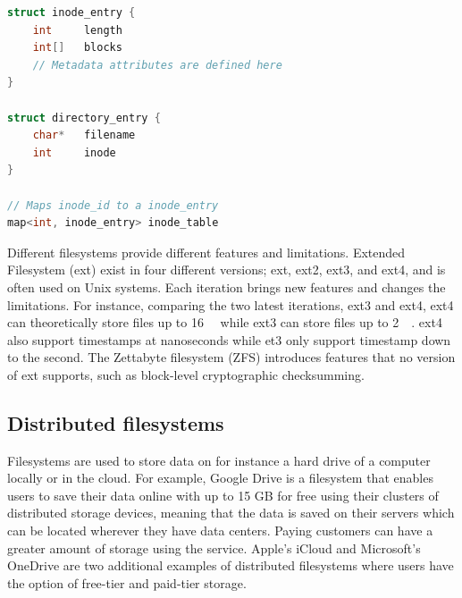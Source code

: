 \begin{minipage}{\linewidth}
\begin{lstlisting}[language=c, caption={Pseudocode of a minimalistic inode filesystem structure}, label=lst:inode_fs]
struct inode_entry {
	int 	length
	int[]	blocks
	// Metadata attributes are defined here
}

struct directory_entry {
	char*   filename
	int     inode
}

// Maps inode_id to a inode_entry
map<int, inode_entry> inode_table

\end{lstlisting}
\end{minipage}

Different filesystems provide different features and limitations. Extended Filesystem (ext) exist in four different versions; ext, ext2, ext3, and ext4, and is often used on Unix systems. Each iteration brings new features and changes the limitations. For instance, comparing the two latest iterations, ext3 and ext4, ext4 can theoretically store files up to \SI{16}{\tebi\byte} while ext3 can store files up to \SI{2}{\tebi\byte}\cite{salterUnderstandingLinuxFilesystems2018}. ext4 also support timestamps at nanoseconds while et3 only support timestamp down to the second. The Zettabyte filesystem (ZFS) introduces features that no version of ext supports, such as block-level cryptographic checksumming.

\subsection{Distributed filesystems}
Filesystems are used to store data on for instance a hard drive of a computer locally or in the cloud. For example, Google Drive is a filesystem that enables users to save their data online with up to 15 GB for free\cite{CloudStorageWork} using their clusters of distributed storage devices, meaning that the data is saved on their servers which can be located wherever they have data centers\cite{DistributedStorageWhat}. Paying customers can have a greater amount of storage using the service. Apple's iCloud and Microsoft's OneDrive are two additional examples of distributed filesystems where users have the option of free-tier and paid-tier storage.

